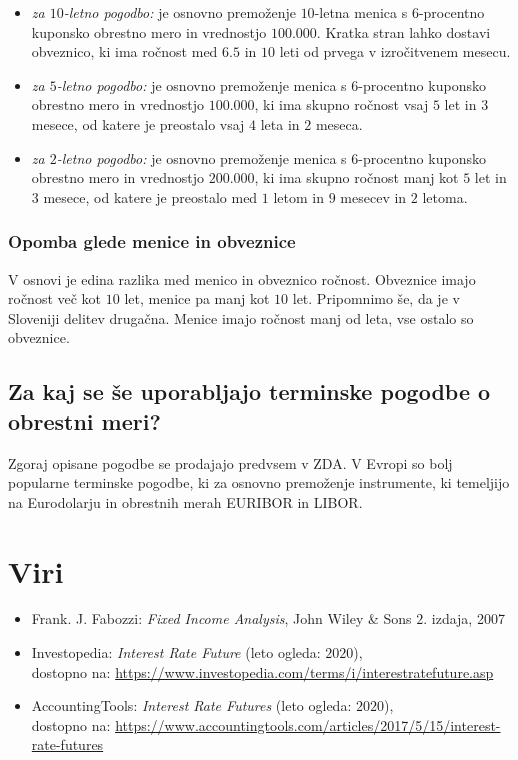 \documentclass[a4paper, 11pt]{article}
\begin{document}
\begin{itemize}
    \item \textit{za $10$-letno pogodbo:} je osnovno premoženje $10$-letna menica s $6$-procentno
            kuponsko obrestno mero in vrednostjo \textdollar$100.000$. Kratka stran lahko dostavi 
            obveznico, ki ima ročnost med $6.5$ in $10$ leti od prvega v izročitvenem mesecu.
    \item \textit{za $5$-letno pogodbo:} je osnovno premoženje menica s $6$-procentno kuponsko 
            obrestno mero in vrednostjo \textdollar$100.000$, ki ima skupno ročnost vsaj $5$ let
            in $3$ mesece, od katere je preostalo vsaj $4$ leta in $2$ meseca.
    \item \textit{za $2$-letno pogodbo:} je osnovno premoženje menica s $6$-procentno kuponsko 
    obrestno mero in vrednostjo \textdollar$200.000$, ki ima skupno ročnost manj kot $5$ let
    in $3$ mesece, od katere je preostalo med $1$ letom in $9$ mesecev in $2$ letoma.
\end{itemize} 

\subsubsection{Opomba glede menice in obveznice}
V osnovi je edina razlika med menico in obveznico ročnost. Obveznice imajo ročnost več kot $10$
let, menice pa manj kot $10$ let. Pripomnimo še, da je v Sloveniji delitev drugačna. Menice imajo
ročnost manj od leta, vse ostalo so obveznice.

\subsection{Za kaj se še uporabljajo terminske pogodbe o obrestni meri?}
Zgoraj opisane pogodbe se prodajajo predvsem v ZDA. V Evropi so bolj popularne terminske pogodbe, ki 
za osnovno premoženje instrumente, ki temeljijo na Eurodolarju in obrestnih merah EURIBOR in LIBOR.

\section{Viri}
\begin{itemize}
    \item Frank. J. Fabozzi: \textit{Fixed Income Analysis}, John Wiley \& Sons $2$. izdaja, 2007
    \item Investopedia: \textit{Interest Rate Future} (leto ogleda: $2020$), \\
            dostopno na: \url{https://www.investopedia.com/terms/i/interestratefuture.asp}
            \item AccountingTools: \textit{Interest Rate Futures} (leto ogleda: $2020$), \\
            dostopno na: \url{https://www.accountingtools.com/articles/2017/5/15/interest-rate-futures}
\end{itemize}
\end{document}
